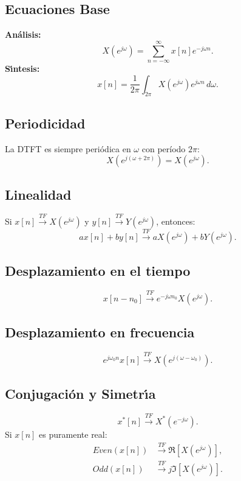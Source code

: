 \documentclass[11pt,a4paper,openany]{book}
\begin{document}
\subsection{Ecuaciones Base}
\textbf{An\'{a}lisis:}
\begin{equation}
	X(e^{j\omega}) = \sum_{n=-\infty}^{\infty} x[n] e^{-j\omega n}.
\end{equation}
\textbf{S\'{\i}ntesis:}
\begin{equation}
	x[n] = \frac{1}{2\pi} \int_{2\pi} X(e^{j\omega}) e^{j\omega n} \, d\omega.
\end{equation}

\subsection{Periodicidad}
La DTFT es siempre periódica en $\omega$ con período $2\pi$:
\begin{equation}
	X(e^{j(\omega + 2\pi)}) = X(e^{j\omega}).
\end{equation}

\subsection{Linealidad}
Si $x[n] \xrightarrow{TF} X(e^{j\omega})$ y $y[n] \xrightarrow{TF} Y(e^{j\omega})$, entonces:
\begin{equation}
	a x[n] + b y[n] \xrightarrow{TF} a X(e^{j\omega}) + b Y(e^{j\omega}).
\end{equation}

\subsection{Desplazamiento en el tiempo}
\begin{equation}
	x[n - n_{0}] \xrightarrow{TF} e^{-j\omega n_{0}} X(e^{j\omega}).
\end{equation}

\subsection{Desplazamiento en frecuencia}
\begin{equation}
	e^{j\omega_{0}n} x[n] \xrightarrow{TF} X(e^{j(\omega - \omega_{0})}).
\end{equation}

\subsection{Conjugaci\'{o}n y Simetr\'{\i}a}
\begin{equation}
	x^*[n] \xrightarrow{TF} X^*(e^{-j\omega}).
\end{equation}
Si $x[n]$ es puramente real:
\begin{align}
	Even(x[n]) &\xrightarrow{TF} \Re[X(e^{j\omega})], \\
	Odd(x[n]) &\xrightarrow{TF} j\Im[X(e^{j\omega})].
\end{align}
\end{document}
